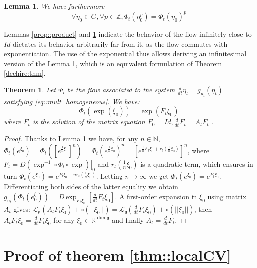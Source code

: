 \documentclass[a4paper,12pt,onecolumn]{article}
\newtheorem{thm}{Theorem}
\newtheorem{lem}{Lemma}
\begin{document}
\begin{lem}
\label{prop::power}
We have furthermore
\[
\forall \eta_0 \in G, \forall p \in \mathbb{Z}, \Phi_t(\eta_0^p)=\Phi_t(\eta_0)^p
\]
\end{lem}
Lemmas \ref{prop::product} and \ref{prop::power} indicate the behavior of the flow infinitely close to $Id$ dictates its behavior arbitrarily far from it, as the flow commutes with exponentiation. The use of the exponential thus allows deriving an infinitesimal version of the Lemma \ref{prop::power}, which is an equivalent formulation of Theorem \ref{dechire:thm}.



\begin{thm}
\label{thm::exp}
Let $\Phi_t$ be the flow associated to the system $\frac{d}{dt}\eta_t=g_{u_t}(\eta_t)$ satisfying \eqref{eq::mult_homogeneous}.
We have:
\color{black}
\[
\Phi_t(\exp(\xi_0))=\exp(F_t \xi_0)
\]
where $F_t$ is the solution of the matrix equation $F_0 = Id, \frac{d}{dt} F_t = A_t F_t$ \color{black}.
\end{thm}
 \begin{proof}
Thanks to Lemma \ref{prop::power} we have, for any $n \in \mathbb{N}$, $
\Phi_t \left( e^{\xi_0} \right)  = \Phi_t \left( \left[ e^{\frac{1}{n} \xi_0} \right]^n \right)  = \Phi_t \left( e^{\frac{1}{n} \xi_0} \right)^n = \left[ e^{\frac{1}{n} F_t \xi_0 + r_t \left( \frac{1}{n} \xi_0 \right) } \right]^n$, where $F_t = \left.D \left( \exp^{-1} \circ \Phi_t \circ \exp \right)\right|_0$ and $r_t \left( \frac{1}{n} \xi_0 \right) $ is a quadratic term, which ensures in turn $\Phi_t \left( e^{\xi_0} \right)= e^{ F_t \xi_0 + n r_t \left( \frac{1}{n}\xi_0 \right)}$.  
Letting $n \rightarrow \infty$ we get $\Phi_t \left( e^{\xi_0} \right) =  e^{ F_t \xi_0}$. Differentiating both sides of the latter equality we obtain $g_{u_t} \left( \Phi_t \left( e^\xi_0 \right) \right)=D \exp_{F_t \xi_0} \left[ \frac{d}{dt} F_t \xi_0 \right]$. A first-order expansion in $\xi_0$ using matrix $A_t$ gives: $\mathcal{L}_{\mathfrak{g}} \left( A_t F_t \xi_0 \right) + \circ \left( || \xi_0 || \right)=\mathcal{L}_{\mathfrak{g}} \left( \frac{d}{dt}F_t \xi_0 \right) + \circ \left( || \xi_0 || \right)$, then $A_t F_t \xi_0 = \frac{d}{dt} F_t \xi_0$ for any $\xi_0 \in \mathbb{R}^{\dim \mathfrak{g}}$ and finally $A_t =  \frac{d}{dt} F_t$.
\color{black}
\end{proof}


\section{Proof of theorem \ref{thm::localCV}}
\label{proof::localCV}
\end{document}

